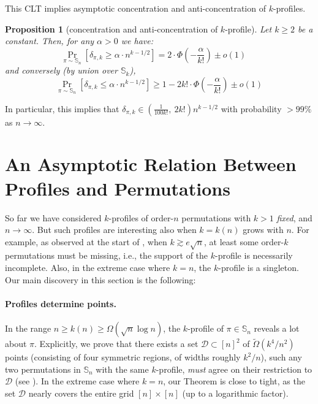 \documentclass{article}
\newtheorem{proposition}[theorem]{Proposition}
\newcommand{\Sn}{\mathbb{S}_n}
\theoremstyle{remark}
\theoremstyle{plain}
\begin{document}
This CLT implies asymptotic concentration and anti-concentration of $k$-profiles.

\begin{proposition}[concentration and anti-concentration of $k$-profile]
    Let $k \ge 2$ be a constant. Then, for any $\alpha > 0$ we have:
    \[
        \Pr_{\pi \sim \Sn} \left[ \delta_{\pi, k} \ge \alpha \cdot n^{k-1/2} \right] = 2 \cdot \Phi\left(-\frac{\alpha}{k!}\right) \pm o(1)\ \ \ \ \ \ 
    \]
    and conversely (by union over $\mathbb{S}_k$),
    \[
        \Pr_{\pi \sim \Sn} \left[ \delta_{\pi, k} \le \alpha \cdot n^{k-1/2} \right] \ge 1 - 2 k! \cdot \Phi\left(-\frac{\alpha}{k!}\right) \pm o(1)
    \]
\end{proposition}

In particular, this implies that $\delta_{\pi, k} \in \left(\frac{1}{100 k!},\ 2 k!\right)n^{k-1/2}$ with probability $> 99\%$ as $n \to \infty$.
 \section{An Asymptotic Relation Between Profiles and Permutations}
\label{section:profiles_to_perms}
So far we have considered $k$-profiles of order-$n$ permutations with $k > 1$ \textit{fixed}, and $n \to \infty$.
But such profiles are interesting also when $k=k(n)$ grows with $n$.
For example, as observed at the start of , when $k \gtrsim e \sqrt{n}$,
at least some order-$k$ permutations must be missing, i.e., the support of the $k$-profile is necessarily incomplete.
Also, in the extreme case where $k=n$, the $k$-profile is a singleton. Our main discovery in this section 
is the following:

\paragraph{Profiles determine points.} In the range 
$n\ge k(n) \ge \Omega(\sqrt{n} \log n)$, the $k$-profile of $\pi\in\Sn$ 
reveals a lot about $\pi$.
Explicitly, we prove that there exists a set $\mathcal{D} \subset [n]^2$ of 
$\widetilde{\Omega}(k^4/n^2)$ points
(consisting of four symmetric regions, of widths roughly $k^2/n$),
such any two permutations in $\Sn$ with the same $k$-profile,
\textit{must} agree on their restriction to $\mathcal{D}$ 
(see ).
In the extreme case where $k=n$, our Theorem is close to tight,
as the set $\mathcal{D}$ nearly covers the entire grid $[n] \times [n]$ (up to a logarithmic factor).
\end{document}
